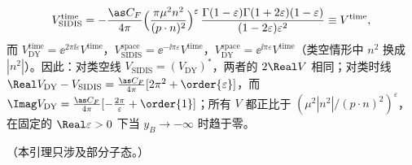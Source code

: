 \begin{lemma}
\begin{enumerate}[label=(\alph*),leftmargin=2.2em,itemsep=1pt,topsep=2pt]
\begin{equation}\label{eq:tmd-vertex-closed}
V^{\mathrm{time}}_{\mathrm{SIDIS}}=-\frac{\as C_F}{4\pi}\Big(\frac{\pi\mu^2n^2}{(p\cdot n)^2}\Big)^{\varepsilon}\,\frac{\Gamma(1-\varepsilon)\Gamma(1+2\varepsilon)(1-\varepsilon)}{(1-2\varepsilon)\varepsilon^2}\equiv V^{\mathrm{time}},
\end{equation}
而 $V^{\mathrm{time}}_{\mathrm{DY}}=\ee^{2\pi\ii\varepsilon}V^{\mathrm{time}}$，$V^{\mathrm{space}}_{\mathrm{SIDIS}}=\ee^{-\ii\pi\varepsilon}V^{\mathrm{time}}$，$V^{\mathrm{space}}_{\mathrm{DY}}=\ee^{\ii\pi\varepsilon}V^{\mathrm{time}}$（类空情形中 $n^2$ 换成 $|n^2|$）。因此：对类空线 $V_{\mathrm{SIDIS}}=(V_{\mathrm{DY}})^*$，两者的 $2\Real V$ 相同；对类时线 $\Real V_{\mathrm{DY}}-V_{\mathrm{SIDIS}}=\frac{\as C_F}{4\pi}[2\pi^2+\order{\varepsilon}]$，而 $\Imag V_{\mathrm{DY}}=\frac{\as C_F}{4\pi}[-\frac{2\pi}{\varepsilon}+\order{1}]$；所有 $V$ 都正比于 $(\mu^2|n^2|/(p\cdot n)^2)^{\varepsilon}$，在固定的 $\Real\varepsilon>0$ 下当 $y_B\to-\infty$ 时趋于零。
\end{enumerate}
（本引理只涉及部分子态。）
\end{lemma}

